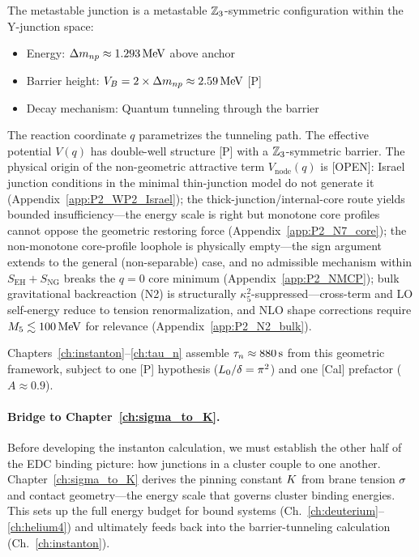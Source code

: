 \begin{resultbox}
    The metastable junction is a metastable $\mathbb{Z}_3$-symmetric configuration within the
    Y-junction space:
    \begin{itemize}
        \item Energy: $\Delta m_{np} \approx 1.293\,\mathrm{MeV}$ above anchor
        \item Barrier height: $V_B = 2 \times \Delta m_{np} \approx 2.59\,\mathrm{MeV}$ [P]
        \item Decay mechanism: Quantum tunneling through the barrier
    \end{itemize}

    The reaction coordinate $q$ parametrizes the tunneling path. The
    effective potential $V(q)$ has double-well structure [P] with a
    $\mathbb{Z}_3$-symmetric barrier. The physical origin of the non-geometric
    attractive term $V_{\mathrm{node}}(q)$ is [OPEN]: Israel junction
    conditions in the minimal thin-junction model do not generate it
    (Appendix~\ref{app:P2_WP2_Israel}); the thick-junction/internal-core
    route yields bounded insufficiency---the energy scale is right but
    monotone core profiles cannot oppose the geometric restoring force
    (Appendix~\ref{app:P2_N7_core}); the non-monotone core-profile
    loophole is physically empty---the sign argument extends to the
    general (non-separable) case, and no admissible mechanism within
    $S_{\mathrm{EH}} + S_{\mathrm{NG}}$ breaks the $q = 0$ core
    minimum (Appendix~\ref{app:P2_NMCP}); bulk gravitational
    backreaction (N2) is structurally $\kappa_5^2$-suppressed---cross-term
    and LO self-energy reduce to tension renormalization, and NLO shape
    corrections require $M_5 \lesssim 100\,\mathrm{MeV}$ for relevance
    (Appendix~\ref{app:P2_N2_bulk}).

    Chapters~\ref{ch:instanton}--\ref{ch:tau_n} assemble
    $\tau_n \approx 880\,\mathrm{s}$ from this geometric framework, subject to one
    [P] hypothesis ($L_0/\delta = \pi^2$) and one [Cal] prefactor ($A \approx 0.9$).
\end{resultbox}

\paragraph{Bridge to Chapter~\ref{ch:sigma_to_K}.}
Before developing the instanton calculation, we must establish the other
half of the EDC binding picture: how junctions in a cluster couple to one
another. Chapter~\ref{ch:sigma_to_K} derives the pinning constant $K$
from brane tension $\sigma$ and contact geometry---the energy scale that
governs cluster binding energies. This sets up the full energy budget for
bound systems (Ch.~\ref{ch:deuterium}--\ref{ch:helium4}) and ultimately
feeds back into the barrier-tunneling calculation (Ch.~\ref{ch:instanton}).
